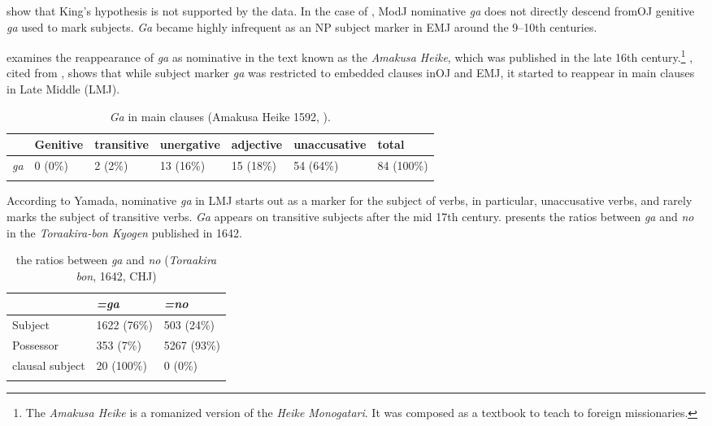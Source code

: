 \documentclass[output=paper]{LSP/langsci}
\begin{document}
\citet{Whitmanetal2015Korean} show that King’s hypothesis is not supported by the  data. In the case of , ModJ nominative \textit{ga} does not directly descend fromOJ  genitive \textit{ga} used to mark  subjects. \textit{Ga} became highly infrequent as an NP subject marker in EMJ around the 9–10th centuries. 

\citet{Yamada2000Expansion} examines the reappearance of \textit{ga} as nominative in the text known as the \textit{Amakusa Heike}, which was published in the late 16th century.\footnote{The \textit{Amakusa Heike} is a romanized version of the \textit{Heike} \textit{Monogatari}. It was composed as a textbook to teach  to foreign missionaries.} 
, cited from \citet{Yamada2000Expansion}, shows that while subject marker \textit{ga} was restricted to embedded clauses inOJ  and EMJ, it started to reappear in main clauses in Late Middle  (LMJ). 

\begin{table}
\caption{\textit{Ga} in main clauses (Amakusa Heike 1592, \citealt{Yamada2000Expansion}).}\label{14-ya-tab:5} 
\begin{tabularx}{\textwidth}{lXXXXlX}
\lsptoprule
& Genitive & transitive & unergative & adjective & unaccusative & total\\
\midrule
\textit{ga} & 0 (0\%) & 2 (2\%) & 13  (16\%) & 15 (18\%) & 54 (64\%) & 84 (100\%)\\
\lspbottomrule
\end{tabularx}
\end{table}

According to Yamada, nominative \textit{ga} in LMJ starts out as a marker for the subject of  verbs, in particular, unaccusative verbs, and rarely marks the subject of transitive verbs. \textit{Ga} appears on transitive subjects after the mid 17th century.  presents the ratios between \textit{ga} and \textit{no} in the \textit{Toraakira-bon Kyogen} published in 1642. 

\begin{table}
\caption{ the ratios between \textit{ga} and \textit{no} (\textit{Toraakira bon}, 1642, CHJ)} \label{14-ya-tab:6}
\begin{tabularx}{\textwidth}{XXX} 
\lsptoprule
& \textit{=ga} & \textit{=no}\\
\midrule
Subject & 1622 (76\%) & 503 (24\%)\\
Possessor & 353 (7\%) & 5267 (93\%)\\
clausal subject & 20 (100\%) & 0 (0\%)\\
\lspbottomrule
\end{tabularx}
\end{table}
\end{document}
